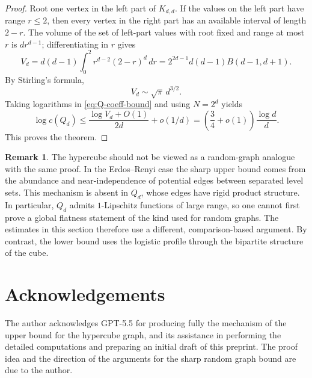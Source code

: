 \documentclass[11pt]{article}
\theoremstyle{definition}
\newtheorem{remark}[theorem]{Remark}
\begin{document}
\begin{proof}
\bigskip
\noindent
Root one vertex in the left part of $K_{d,d}$.  If the values on the left part have range $r\le2$, then every vertex in the right part has an available interval of length $2-r$.  The volume of the set of left-part values with root fixed and range at most $r$ is $d r^{d-1}$; differentiating in $r$ gives
\begin{equation}\label{eq:Kdd-volume}
  V_d=d(d-1)\int_0^2 r^{d-2}(2-r)^d\,dr
  =2^{2d-1}d(d-1)B(d-1,d+1).
\end{equation}
By Stirling's formula,
\[
  V_d\sim \sqrt{\pi}\,d^{3/2}.
\]
Taking logarithms in \eqref{eq:Q-coeff-bound} and using $N=2^d$ yields
\[
  \log c(Q_d)
  \le \frac{\log V_d+O(1)}{2d}+o(1/d)
  =\left(\frac34+o(1)\right)\frac{\log d}{d}.
\]
This proves the theorem.
\end{proof}

\begin{remark}
The hypercube should not be viewed as a random-graph analogue with the same proof.  In the Erdos--Renyi case the sharp upper bound comes from the abundance and near-independence of potential edges between separated level sets.  This mechanism is absent in $Q_d$, whose edges have rigid product structure.  In particular, $Q_d$ admits $1$-Lipschitz functions of large range, so one cannot first prove a global flatness statement of the kind used for random graphs.  The estimates in this section therefore use a different, comparison-based argument.  By contrast, the lower bound uses the logistic profile through the bipartite structure of the cube.
\end{remark}

\section*{Acknowledgements} The author acknowledges GPT-5.5 for producing fully the mechanism of the upper bound for the hypercube graph, and its assistance in performing the detailed computations and preparing an initial draft of this preprint. The proof idea and the direction of the arguments for the sharp random graph bound are due to the author.
\end{document}
